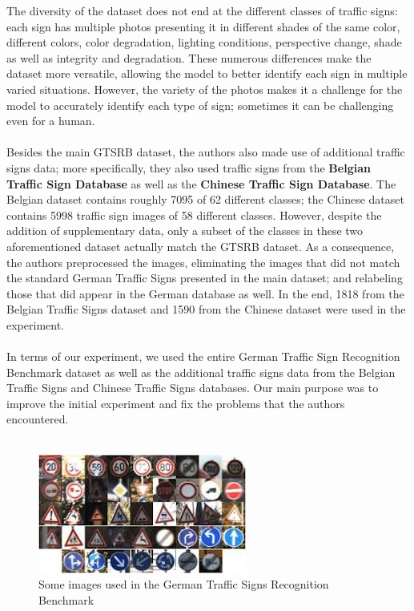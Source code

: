 \documentclass[12pt,a4paper]{report}
\begin{document}
The diversity of the dataset does not end at the different classes of traffic signs: each sign has multiple photos presenting it in different shades of the same color, different colors, color degradation, lighting conditions, perspective change, shade as well as integrity and degradation. These numerous differences make the dataset more versatile, allowing the model to better identify each sign in multiple varied situations. However, the variety of the photos makes it a challenge for the model to accurately identify each type of sign; sometimes it can be challenging even for a human.\\ \\
Besides the main GTSRB dataset, the authors also made use of additional traffic signs data; more specifically, they also used traffic signs from the \textbf{Belgian Traffic Sign Database} as well as the \textbf{Chinese Traffic Sign Database}. The Belgian dataset contains roughly 7095 of 62 different classes; the Chinese dataset contains 5998 traffic sign images of 58 different classes. However, despite the addition of supplementary data, only a subset of the classes in these two aforementioned dataset actually match the GTSRB dataset. As a consequence, the authors preprocessed the images, eliminating the images that did not match the standard German Traffic Signs presented in the main dataset; and relabeling those that did appear in the German database as well. In the end, 1818 from the Belgian Traffic Signs dataset and 1590 from the Chinese dataset were used in the experiment.\\\\
In terms of our experiment, we used the entire German Traffic Sign Recognition Benchmark dataset as well as the additional traffic signs data from the Belgian Traffic Signs and Chinese Traffic Signs databases. Our main purpose was to improve the initial experiment and fix the problems that the authors encountered. \\\\

\begin{figure}[h]
\centering
\includegraphics[scale=0.8]{figure2.jpg}
\caption{Some images used in the German Traffic Signs Recognition Benchmark}
\end{figure}
\end{document}
